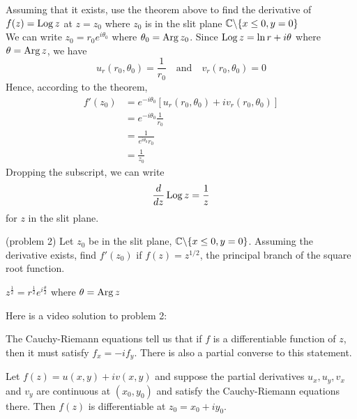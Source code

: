 \documentclass[handout]{ximera}
\begin{document}
\begin{example}[example 2]
Assuming that it exists, use the theorem above to find the derivative of $f(z) = \operatorname{Log} z$ 
at $z = z_0$ where $z_0$ is in the 
slit plane $\mathbb C \backslash \{x\leq 0, y=0\}$ \\
We can write $z_0 = r_0 e^{i\theta_0}$ where $\theta_0 = \operatorname{Arg} z_0$. Since $\operatorname{Log} z = \ln r + i\theta$
where $\theta = \operatorname{Arg} z$, we have 
\[
u_r(r_0,\theta_0) = \frac{1}{r_0} \quad \mbox{and} \quad v_r(r_0,\theta_0) = 0
\]
Hence, according to the theorem,
\begin{align*}
f'(z_0) &= e^{-i\theta_0}[u_r(r_0,\theta_0)+iv_r(r_0,\theta_0)] \\
        &= e^{-i\theta_0}\frac{1}{r_0}\\
        &= \frac{1}{e^{i\theta_0}r_0}\\
        &= \frac{1}{z_0}
\end{align*}
Dropping the subscript, we can write
\[
\frac{d}{dz} \operatorname{Log} z = \frac{1}{z}
\]
for $z$ in the slit plane.
\end{example}

\begin{problem}(problem 2)
Let $z_0$ be in the slit plane, $\mathbb C \backslash \{x\leq 0, y=0\}$. 
Assuming the derivative exists, find $f'(z_0)$ if $f(z) = z^{1/2}$, 
the principal branch of the square root function.
\begin{hint}
$\displaystyle z^{\frac12} = r^{\frac12}e^{i\frac{\theta}{2}}$ where $\theta = \operatorname{Arg} z$
\end{hint}
\end{problem}

Here is a video solution to problem 2:\\
\begin{foldable}
\end{foldable}

The Cauchy-Riemann equations tell us that if $f$ is a differentiable function of $z$, 
then it must satisfy $f_x = -if_y$.
There is also a partial converse to this statement.  

\begin{theorem}
Let $f(z) = u(x,y) + iv(x,y)$ and suppose the partial derivatives $u_x, u_y, v_x$ and $v_y$ are 
continuous at $(x_0,y_0)$ and 
 satisfy the Cauchy-Riemann equations there. Then $f(z)$
is differentiable at $z_0 = x_0 + iy_0$.
\end{theorem}
\end{document}
